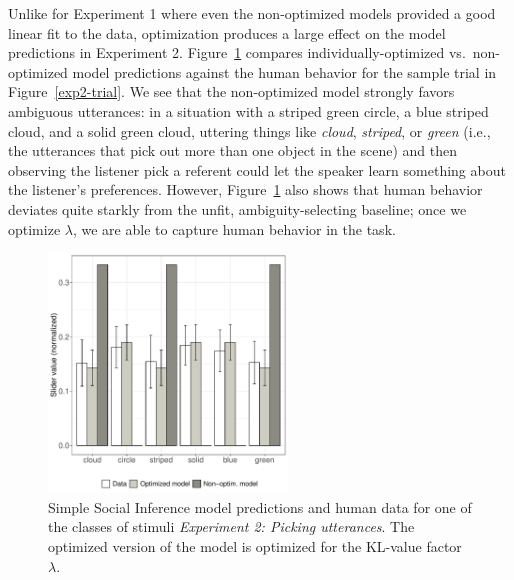 \documentclass[10pt,a4paper]{article}
\newcommand{\gcs}[1]{\textcolor{blue}{[gcs: #1]}}
\begin{document}
Unlike for Experiment 1 where even the non-optimized models provided a good linear fit to the data, optimization produces a large effect on the model predictions in Experiment 2. Figure~\ref{barplot_x3} compares individually-optimized vs.~non-optimized model predictions against the human behavior for the sample trial in Figure~\ref{exp2-trial}. We see that the non-optimized model strongly favors ambiguous utterances: in a situation with a striped green circle, a blue striped cloud, and a solid green cloud, uttering things like \textit{cloud}, \textit{striped}, or \textit{green} (i.e., the utterances that pick out more than one object in the scene) and then observing the listener pick a referent could let the speaker learn something about the listener's preferences. However, Figure~\ref{barplot_x3} also shows that human behavior deviates quite starkly from the unfit, ambiguity-selecting baseline; once we optimize $\lambda$, we are able to capture human behavior in the task.

\begin{figure}[ht!]
	\centering
	\includegraphics[width=2.5in]{images/barplot_x3.pdf}
	\caption{Simple Social Inference model predictions and human data for one of the classes of stimuli \emph{Experiment 2: Picking utterances}. The optimized version of the model is optimized for the KL-value factor $\lambda$.}\label{barplot_x3}
\end{figure}

\end{document}
